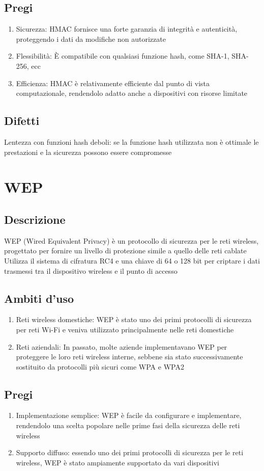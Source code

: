 \documentclass[10pt,oneside,a4paper]{article}
\begin{document}
\begin{enumerate}
\subsection{Pregi}
\begin{enumerate}
\item Sicurezza: HMAC fornisce una forte garanzia di integrità e autenticità, proteggendo i dati da modifiche non autorizzate
\item Flessibilità: È compatibile con qualsiasi funzione hash, come SHA-1, SHA-256, ecc
\item Efficienza: HMAC è relativamente efficiente dal punto di vista computazionale, rendendolo adatto anche a dispositivi con risorse limitate
\end{enumerate}
\subsection{Difetti}
Lentezza con funzioni hash deboli: se la funzione hash utilizzata non è ottimale le prestazioni e la sicurezza possono essere compromesse
\end{enumerate}
\section{WEP}
\subsection{Descrizione}
WEP (Wired Equivalent Privacy) è un protocollo di sicurezza per le reti wireless, progettato per fornire un livello di protezione simile a quello delle reti cablate\\
Utilizza il sistema di cifratura RC4 e una chiave di 64 o 128 bit per criptare i dati trasmessi tra il dispositivo wireless e il punto di accesso
\subsection{Ambiti d'uso}
\begin{enumerate}
\item Reti wireless domestiche: WEP è stato uno dei primi protocolli di sicurezza per reti Wi-Fi e veniva utilizzato principalmente nelle reti domestiche
\item Reti aziendali: In passato, molte aziende implementavano WEP per proteggere le loro reti wireless interne, sebbene sia stato successivamente sostituito da protocolli più sicuri come WPA e WPA2
\end{enumerate}
\subsection{Pregi}
\begin{enumerate}
\item Implementazione semplice: WEP è facile da configurare e implementare, rendendolo una scelta popolare nelle prime fasi della sicurezza delle reti wireless
\item Supporto diffuso: essendo uno dei primi protocolli di sicurezza per le reti wireless, WEP è stato ampiamente supportato da vari dispositivi
\end{enumerate}
\end{document}
